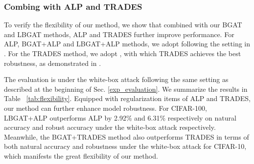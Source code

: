\documentclass[10pt,twocolumn,letterpaper]{article}
\begin{document}
\subsubsection{Combing with ALP and TRADES}
\label{exp_flexibility}
To verify the flexibility of our method, we show that combined with our BGAT and LBGAT methods, ALP and TRADES further improve performance. For ALP, BGAT+ALP and LBGAT+ALP methods, we adopt  following the setting in \cite{DBLP:journals/corr/abs-1803-06373}. For the TRADES method, we adopt , with which TRADES achieves the best robustness, as demonstrated in \cite{zhang2019theoretically}.

The evaluation is under the white-box attack following the same setting as described at the beginning of Sec. \ref{exp_evaluation}.
We summarize the results in Table ~\ref{tab:flexibility}. Equipped with regularization items of ALP and TRADES, our method can further enhance model robustness. For CIFAR-100, LBGAT+ALP outperforms ALP by 2.92\% and 6.31\% respectively on natural accuracy and robust accuracy under the white-box attack respectively. Meanwhile, the BGAT+TRADES method also outperforms TRADES in terms of both natural accuracy and robustness under the white-box attack for CIFAR-10, which manifests the great flexibility of our method. 
\end{document}
